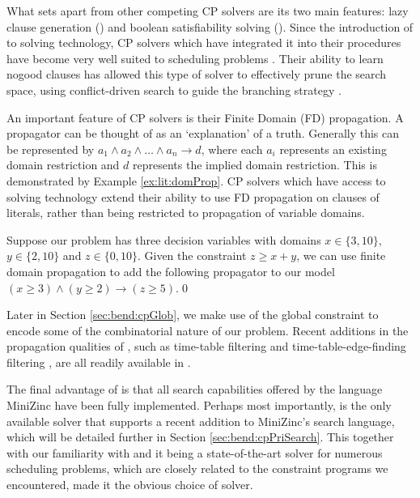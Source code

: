 What sets \chuffed apart from other competing CP solvers 
are its two main features:
lazy clause generation (\LCG) and boolean satisfiability solving (\SAT).
Since the introduction of \LCG to solving technology, CP solvers
which have integrated it into their procedures
have become very well suited to scheduling problems \cite{Ohrimenko2009}.
Their ability to learn nogood clauses 
has allowed this type of solver to effectively prune the search space,
using conflict-driven search to guide the branching strategy \cite{Szeredi2016,Schutt2015,Schutt2011b,Schutt2013b}.

An important feature of CP solvers is their Finite Domain (FD) propagation.
A propagator can be thought of as an `explanation' of a truth. Generally
this can be represented by $a_1\wedge a_2 \wedge \ldots\wedge a_n \rightarrow d$,
where each $a_i$ represents an existing domain restriction and $d$ represents
the implied domain restriction. This is demonstrated by Example \ref{ex:lit:domProp}.
CP solvers which have access to \SAT solving technology extend their ability
to use FD propagation on clauses of literals, rather
than being restricted to propagation of variable domains.
\begin{example}\label{ex:lit:domProp}
	Suppose our problem has three decision variables with domains
	$x\in\{3,10\}$, $y\in\{2,10\}$ and $z\in\{0,10\}$. Given the constraint
	$z\geq x+y$, we can use finite domain propagation to add the following
	propagator to our model $(x\geq3)\wedge(y\geq2) \rightarrow (z\geq5)$.\qed
\end{example}

Later in Section \ref{sec:bend:cpGlob}, we make use of
the global constraint \cumu to encode some of the combinatorial
nature of our problem.
Recent additions in the propagation qualities of \cumu, such as
time-table filtering \cite{Schutt2011a} and 
time-table-edge-finding filtering \cite{Schutt2013c},
are all readily available in \chuffed.

The final advantage of \chuffed is that all
search capabilities offered by the language MiniZinc
have been fully implemented.
Perhaps most importantly, \chuffed
is the only available solver that supports a recent
addition to MiniZinc's search language,
which will be detailed further in Section \ref{sec:bend:cpPriSearch}.
This together with our familiarity with \chuffed and 
it being a state-of-the-art solver for numerous scheduling
problems, which are closely related to the constraint programs we encountered,
made it the obvious choice of solver.

